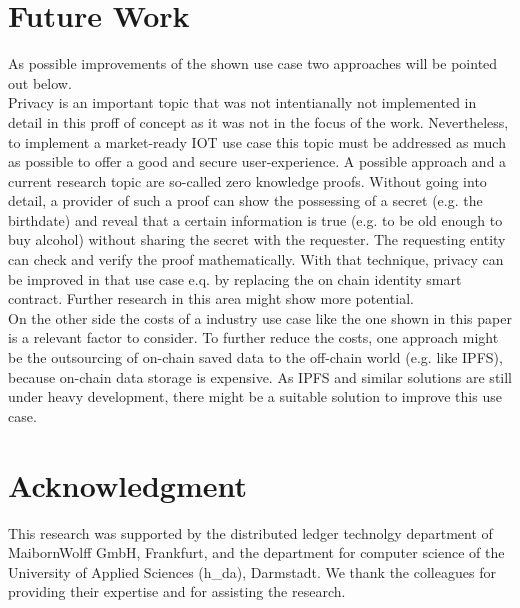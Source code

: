 \documentclass[conference]{IEEEtran}
\begin{document}
\section{Future Work}
As possible improvements of the shown use case two approaches will be pointed out below.\\
Privacy is an important topic that was not intentianally not implemented in detail in this proff of concept as it was not in the focus of the work. Nevertheless, to implement a market-ready IOT use case this topic must be addressed as much as possible to offer a good and secure user-experience. A possible approach and a current research topic are so-called zero knowledge proofs. Without going into detail, a provider of such a proof can show the possessing of a secret (e.g. the birthdate) and reveal that a certain information is true (e.g. to be old enough to buy alcohol) without sharing the secret with the requester. The requesting entity can check and verify the proof mathematically. With that technique, privacy can be improved in that use case e.q. by replacing the on chain identity smart contract. Further research in this area might show more potential.\\
On the other side the costs of a industry use case like the one shown in this paper is a relevant factor to consider. To further reduce the costs, one approach might be the outsourcing of on-chain saved data to the off-chain world (e.g. like IPFS), because on-chain data storage is expensive. As IPFS and similar solutions are still under heavy development, there might be a suitable solution to improve this use case.


\section*{Acknowledgment}
This research was supported by the distributed ledger technolgy department of MaibornWolff GmbH, Frankfurt, and the department for computer science of the University of Applied Sciences (h\_da), Darmstadt. We thank the colleagues for providing their expertise and for assisting the research.





\end{document}
